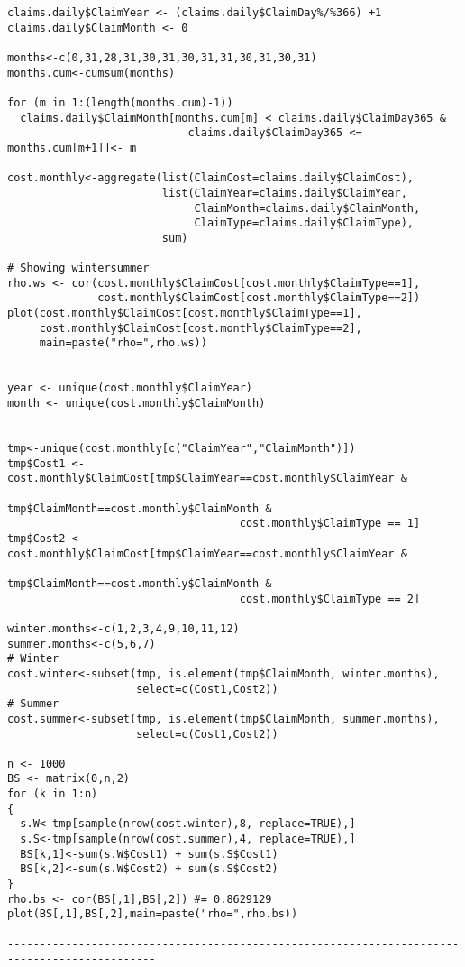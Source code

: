 \documentclass[11pt]{article}
\begin{document}
\begin{verbatim}
claims.daily$ClaimYear <- (claims.daily$ClaimDay%/%366) +1
claims.daily$ClaimMonth <- 0

months<-c(0,31,28,31,30,31,30,31,31,30,31,30,31)
months.cum<-cumsum(months)

for (m in 1:(length(months.cum)-1))
  claims.daily$ClaimMonth[months.cum[m] < claims.daily$ClaimDay365 &
                            claims.daily$ClaimDay365 <= months.cum[m+1]]<- m

cost.monthly<-aggregate(list(ClaimCost=claims.daily$ClaimCost),
                        list(ClaimYear=claims.daily$ClaimYear,
                             ClaimMonth=claims.daily$ClaimMonth,
                             ClaimType=claims.daily$ClaimType),
                        sum)

# Showing wintersummer
rho.ws <- cor(cost.monthly$ClaimCost[cost.monthly$ClaimType==1],
              cost.monthly$ClaimCost[cost.monthly$ClaimType==2])
plot(cost.monthly$ClaimCost[cost.monthly$ClaimType==1],
     cost.monthly$ClaimCost[cost.monthly$ClaimType==2],
     main=paste("rho=",rho.ws))


year <- unique(cost.monthly$ClaimYear)
month <- unique(cost.monthly$ClaimMonth)


tmp<-unique(cost.monthly[c("ClaimYear","ClaimMonth")])
tmp$Cost1 <- cost.monthly$ClaimCost[tmp$ClaimYear==cost.monthly$ClaimYear &
                                    tmp$ClaimMonth==cost.monthly$ClaimMonth &
                                    cost.monthly$ClaimType == 1]
tmp$Cost2 <- cost.monthly$ClaimCost[tmp$ClaimYear==cost.monthly$ClaimYear &
                                    tmp$ClaimMonth==cost.monthly$ClaimMonth &
                                    cost.monthly$ClaimType == 2]

winter.months<-c(1,2,3,4,9,10,11,12)
summer.months<-c(5,6,7)
# Winter
cost.winter<-subset(tmp, is.element(tmp$ClaimMonth, winter.months), 
                    select=c(Cost1,Cost2))
# Summer
cost.summer<-subset(tmp, is.element(tmp$ClaimMonth, summer.months), 
                    select=c(Cost1,Cost2))

n <- 1000
BS <- matrix(0,n,2)
for (k in 1:n)
{
  s.W<-tmp[sample(nrow(cost.winter),8, replace=TRUE),]
  s.S<-tmp[sample(nrow(cost.summer),4, replace=TRUE),]
  BS[k,1]<-sum(s.W$Cost1) + sum(s.S$Cost1)
  BS[k,2]<-sum(s.W$Cost2) + sum(s.S$Cost2)
}
rho.bs <- cor(BS[,1],BS[,2]) #= 0.8629129
plot(BS[,1],BS[,2],main=paste("rho=",rho.bs))

---------------------------------------------------------------------------------------------


\end{verbatim}
\end{document}
